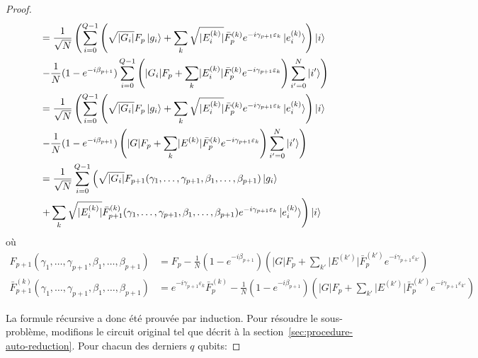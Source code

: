 \begin{proof}
\begin{equation}
\begin{aligned}
&= \frac{1}{\sqrt{ N }} \left( \sum_{i=0}^{Q-1} \left( \sqrt{ \lvert G_{i} \rvert  } F_{p} \ket{g_{i}} + \sum_{k} \sqrt{ \lvert E^{(k)}_{i} \rvert  }\bar{F}^{(k)}_{p} e^{-i \gamma_{p+1} \varepsilon_{k}} \ket{e^{(k)}_{i}} \right) \ket{i} \right. \\
& \left. - \frac{1}{N} (1 - e^{-i\beta_{p+1}}) \sum_{i=0}^{Q-1} \left(  \lvert G_{i} \rvert F_{p} + \sum_{k} \lvert E^{(k)}_{i} \rvert \bar{F}^{(k)}_{p} e^{-i \gamma_{p+1} \varepsilon_{k}}\right) \sum_{i'=0}^{N} \ket{i'} \right) \\
&= \frac{1}{\sqrt{ N }} \left( \sum_{i=0}^{Q-1} \left( \sqrt{ \lvert G_{i} \rvert  } F_{p} \ket{g_{i}} + \sum_{k} \sqrt{ \lvert E^{(k)}_{i} \rvert  }\bar{F}^{(k)}_{p} e^{-i \gamma_{p+1} \varepsilon_{k}} \ket{e^{(k)}_{i}} \right) \ket{i} \right. \\
& \left.- \frac{1}{N} (1 - e^{-i\beta_{p+1}}) \left(  \lvert G \rvert F_{p} + \sum_{k} \lvert E^{(k)} \rvert \bar{F}^{(k)}_{p} e^{-i \gamma_{p+1} \varepsilon_{k}}\right) \sum_{i'=0}^{N} \ket{i'} \right) \\
&= \frac{1}{\sqrt{ N }} \sum_{i=0}^{Q-1} \left( \sqrt{ \lvert G_{i} \rvert  } F_{p+1}(\gamma_{1}, \dots, \gamma_{p+1}, \beta_{1}, \dots, \beta_{p+1}) \ket{g_{i}} \right. \\
& \left. + \sum_{k} \sqrt{ \lvert E^{(k)}_{i} \rvert  } \bar{F}^{(k)}_{p+1}(\gamma_{1}, \dots, \gamma_{p+1}, \beta_{1}, \dots, \beta_{p+1}) e^{-i \gamma_{p+1} \varepsilon_{k}} \ket{e^{(k)}_{i}} \right) \ket{i} \\
\end{aligned}
\end{equation}
où
\begin{equation}
\begin{aligned}
F_{p+1}(\gamma_{1}, \dots, \gamma_{p+1}, \beta_{1}, \dots, \beta_{p+1}) &= F_{p} - \frac{1}{N} (1-e^{-i\beta_{p+1}}) \left( \lvert G \rvert   F_{p} + \sum_{k'} \lvert E^{(k')} \rvert \bar{F}^{(k')}_{p} e^{-i\gamma_{p+1}\varepsilon_{k'}} \right) \\
\bar{F}^{(k)}_{p+1}(\gamma_{1}, \dots, \gamma_{p+1}, \beta_{1}, \dots, \beta_{p+1}) &= e^{-i\gamma_{p+1} \varepsilon_{k}}\bar{F}_{p}^{(k)} - \frac{1}{N} (1-e^{-i\beta_{p+1}}) \left( \lvert G \rvert   F_{p} + \sum_{k'} \lvert E^{(k')} \rvert \bar{F}^{(k')}_{p} e^{-i\gamma_{p+1}\varepsilon_{k'}} \right)
\end{aligned}
\end{equation}

La formule récursive a donc été prouvée par induction. Pour résoudre le sous-problème, modifions le circuit original tel que décrit à la section~\ref{sec:procedure-auto-reduction}. Pour chacun des derniers $q$ qubits:


\end{proof}
